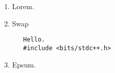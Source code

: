 \documentclass[12pt]{article}
\begin{document}
\begin{enumerate}
  \item Lorem.
  \item
   \begin{codebox}{Swap}
      \begin{Verbatim}
   Hello.
   #include <bits/stdc++.h>
      \end{Verbatim}
    \end{codebox}
  \item Epsum.
\end{enumerate}
\end{document}
